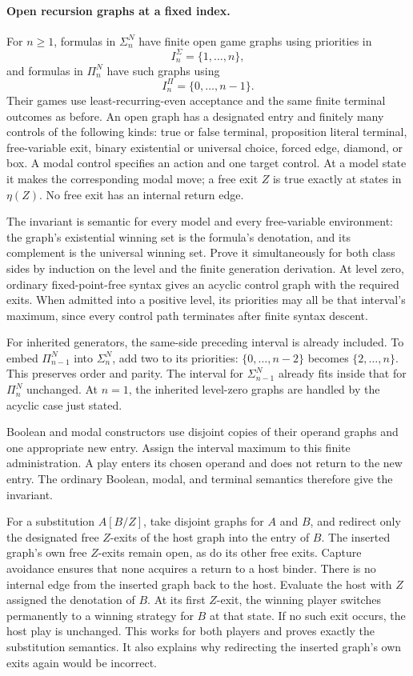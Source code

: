 \paragraph{Open recursion graphs at a fixed index.}
\label{sec:p09-mu-niwinski-index}
For \(n\geq1\), formulas
in \(\Sigma_n^N\) have
finite open game graphs
using priorities in
\[
 I_n^\Sigma=\{1,\ldots,n\},
\]
and formulas in \(\Pi_n^N\)
have such graphs using
\[
 I_n^\Pi=\{0,\ldots,n-1\}.
\]
Their games use least-recurring-even
acceptance and the same
finite terminal outcomes
as before.
An open graph has a
designated entry and finitely
many controls of the
following kinds: true or
false terminal, proposition
literal terminal, free-variable
exit, binary existential
or universal choice, forced
edge, diamond, or box.
A modal control specifies
an action and one target
control. At a model state
it makes the corresponding
modal move; a free exit
\(Z\) is true exactly
at states in \(\eta(Z)\).
No free exit has an
internal return edge.

The invariant is semantic
for every model and
every free-variable environment:
the graph's existential
winning set is the formula's
denotation, and its complement
is the universal winning
set. Prove it simultaneously
for both class sides by
induction on the level
and the finite generation
derivation.
At level zero, ordinary
fixed-point-free syntax gives
an acyclic control graph
with the required exits.
When admitted into a
positive level, its priorities
may all be that interval's
maximum, since every control
path terminates after finite
syntax descent.

For inherited generators,
the same-side preceding
interval is already included.
To embed \(\Pi_{n-1}^N\)
into \(\Sigma_n^N\), add
two to its priorities:
\(\{0,\ldots,n-2\}\)
becomes \(\{2,\ldots,n\}\).
This preserves order and
parity. The interval for
\(\Sigma_{n-1}^N\) already
fits inside that for
\(\Pi_n^N\) unchanged.
At \(n=1\), the inherited
level-zero graphs are
handled by the acyclic
case just stated.

Boolean and modal constructors
use disjoint copies of
their operand graphs and
one appropriate new entry.
Assign the interval maximum
to this finite administration.
A play enters its chosen
operand and does not return
to the new entry.
The ordinary Boolean,
modal, and terminal semantics
therefore give the invariant.

For a substitution \(A[B/Z]\),
take disjoint graphs for
\(A\) and \(B\), and
redirect only the designated
free \(Z\)-exits of the
host graph into the
entry of \(B\).
The inserted graph's
own free \(Z\)-exits
remain open, as do
its other free exits.
Capture avoidance ensures
that none acquires a
return to a host binder.
There is no internal
edge from the inserted
graph back to the host.
Evaluate the host with
\(Z\) assigned the
denotation of \(B\).
At its first \(Z\)-exit,
the winning player switches
permanently to a winning
strategy for \(B\) at
that state. If no
such exit occurs, the
host play is unchanged.
This works for both
players and proves exactly
the substitution semantics.
It also explains why
redirecting the inserted
graph's own exits again
would be incorrect.

